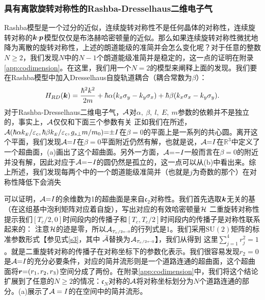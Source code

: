 \subsubsection{具有离散旋转对称性的Rashba-Dresselhaus二维电子气}\label{sec:disrot}

Rashba模型是一个过分的近似，连续旋转对称性不是任何晶体的对称性，连续旋转对称的$\boldsymbol{k}{\cdot}\boldsymbol{p}$模型仅仅是布洛赫哈密顿量的近似。那么如果连续旋转对称性微扰地降为离散的旋转对称性，上述的朗道能级的准简并会怎么变化呢？对于任意的整数$N{\geq}2$，我们发现$N$中的$N{-}1$个朗道能级准简并是稳定的，这一点的证明在附录\ref{app:codimension}。在这里，我们用一个$N{=}2$的模型来阐释上面的发现。我们要在Rashba模型中加入Dresselhaus自旋轨道耦合（耦合常数为$\beta$）：
\begin{equation}
H_{RD}(\boldsymbol{k})=\frac{{\hbar^2}k^2}{2m}+\hbar\alpha(k_{x}\sigma_{y}-k_{y}\sigma_{x})+\hbar\beta(k_{x}\sigma_{x}-k_{y}\sigma_{y}).\label{hamRD}
\end{equation}
对于Rashba-Dresselhaus二维电子气，${\cal A}$对$\alpha,~\beta,~l,~E,~m$参数的依赖并不是独立的，事实上，${\cal A}$仅仅和下面三个参数有关
正如我们在所述，${\cal A}(\hbar\alpha k_{\scriptscriptstyle{E}}/\varepsilon_c,\hbar\beta k_{\scriptscriptstyle{E}}/\varepsilon_c,g_{s\perp}m/m_0){=}{\pm} I$在$\beta{=}0$的平面上是一系列的共心圆。离开这个平面，我们发现${\cal A}{=}I$在$\beta{=}0$平面附近仍然有解，也就是说，${\cal A}{=}I$在$\mathbb{R}^3$中定义了一个超曲面，(a)画出了这个超曲面。另外一方面，${\cal A}{=}{-}I$一般而言在$\beta{=}0$的附近并没有解，因此对应于${\cal A}{=}{-}I$的圆仍然是孤立的，这一点可以从(b)中看出来。综上所述，我们发现每两个中的一个朗道能级准简并（也就是$j$为奇数的那个）在对称性降低下会消失

可以证明，${\cal A}{=}I$的余维数为1的超曲面是来自$\mathfrak{c}_2$对称性。我们首先选取$\boldsymbol{k}$无关的基（在这组基中泡利矩阵对应着自旋），写出对应的有效哈密顿量${\cal H}$ 
二重旋转对称性
提示我们$[T_c/2,0]$时间段内的传播子和$[T_c,T_c/2]$时间段内的传播子是对称性联系起来的：
注意${\cal H}$的迹是零，所以${{\cal A}}_{\scriptscriptstyle{T_c/2\leftarrow 0}}$的行列式是1。我们采用$\text{SU}(2)$矩阵的标准参数形式【参见式\ref{s3}，其中 ${\cal \bar{A}}$替换为${{\cal A}}_{\scriptscriptstyle{T_c/2\leftarrow 0}}$】，我们从得到
这里$\sum_{j=1}^4r_j^2{=}1$。就是二重旋转对称的传播子在对称坐标下的参数化表示。我们很容易发现$r_2{=}0$是${\cal A}{=}I$的充分必要条件，对应的简并流形则是一个道路连通的超曲面，这个超曲面将$\boldsymbol{r}{=}(r_1,r_2,r_3)$空间分成了两份。在附录\ref{app:codimension}中，我们将这个结论扩展到了任意的$N{\geq}2$的情况：$\mathfrak{c}_N$对称的${\cal A}$将对称坐标划分为$N$个道路连通的部分。(a)展示了${\cal A}=I$的在空间中的简并流形。


